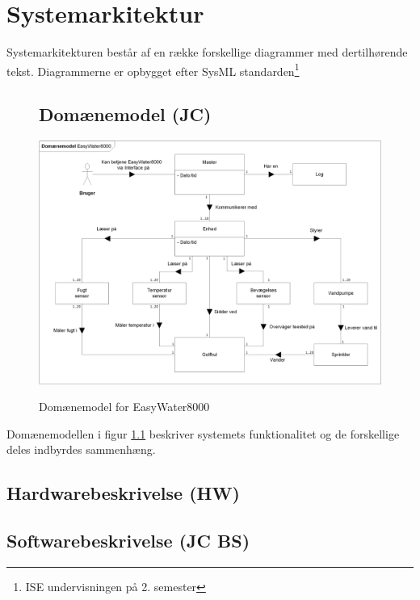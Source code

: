 \chapter{Systemarkitektur}
Systemarkitekturen består af en række forskellige diagrammer med dertilhørende tekst. Diagrammerne er opbygget efter SysML standarden\footnote{ISE undervisningen på 2. semester}

\begin{figure}[htbp] \centering
\section{Domænemodel (JC)}
{\includegraphics[width=\textwidth]{filer/systemarkitektur/Domainmodel}}
\caption{Domænemodel for EasyWater8000}
\label{lab:domainmodel}
\end{figure}
Domænemodellen i figur \ref{lab:domainmodel} beskriver systemets funktionalitet og de forskellige deles indbyrdes sammenhæng. 

\newpage
\section{Hardwarebeskrivelse (HW)}


\clearpage
\section{Softwarebeskrivelse (JC BS)}
